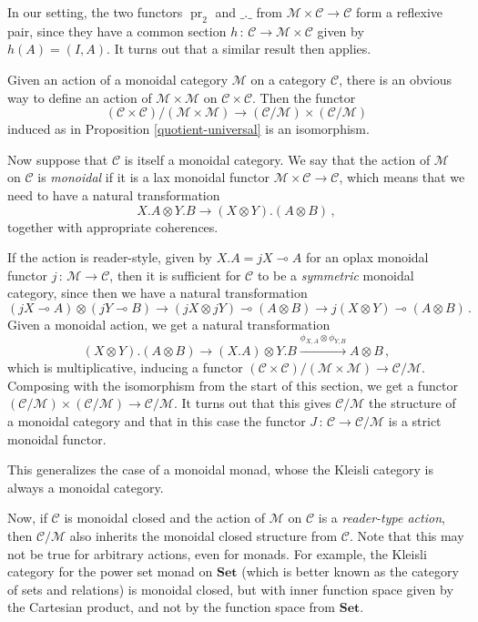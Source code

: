 \documentclass{svproc}
\newcommand\C{\mathcal{C}}
\newcommand\M{\mathcal{M}}
\DeclareMathOperator\pr{pr}
\newcommand\from{\,\colon\,}
\newcommand\tensor\otimes
\renewcommand\implies\multimap
\newcommand{\catname}[1]{\mathbf{#1}}
\newcommand{\Set}{\catname{Set}}
\begin{document}
In our setting, the two functors $\pr_2$ and $\_.\_$ from $\M\times\C \to \C$ form a reflexive pair, since they have a common section $h\from \C \to \M\times \C$ given by $h(A) = (I, A)$.  
It turns out that a similar result then applies.

\begin{proposition}
  Given an action of a monoidal category $\M$ on a category $\C$, there is an obvious way to define an action of $\M\times\M$ on $\C\times\C$.  
  Then the functor
  \[
    (\C\times\C)/(\M\times\M) \to (\C/\M) \times (\C/\M)
    \]
  induced as in Proposition \ref{quotient-universal} is an isomorphism.
  \label{monoidality}
\end{proposition}

Now suppose that $\C$ is itself a monoidal category.  
We say that the action of $\M$ on $\C$ is \emph{monoidal} if it is a lax monoidal functor $\M\times\C\to\C$, which means that we need to have a natural transformation 
\[
  X.A\tensor Y.B\to (X\tensor Y).(A\tensor B)\,,
  \]
together with appropriate coherences.  

If the action is reader-style, given by $X.A = jX \implies A$ for an oplax monoidal functor $j\from \M\to \C$, then it is sufficient for $\C$ to be a \emph{symmetric} monoidal category, since then we have a natural transformation
\[
  (j X \implies A) \tensor (j Y \implies B)
  \rightarrow
  (j X \tensor j Y) \implies (A \tensor B)
  \rightarrow
  j (X\tensor Y) \implies (A \tensor B)\,.
  \]
Given a monoidal action, we get a natural transformation
\[
  (X\tensor Y).(A\tensor B)
  \rightarrow
  (X.A)\tensor Y.B
  \xrightarrow{\phi_{X,A}\tensor \phi_{Y,B}}
  A\tensor B\,,
  \]
which is multiplicative, inducing a functor $(\C\times\C)/(\M\times\M)\to \C/\M$.  
Composing with the isomorphism from the start of this section, we get a functor $(\C/\M)\times(\C/\M)\to\C/\M$.  
It turns out that this gives $\C/\M$ the structure of a monoidal category and that in this case the functor $J\from \C\to\C/\M$ is a strict monoidal functor.

This generalizes the case of a monoidal monad, whose the Kleisli category is always a monoidal category.

Now, if $\C$ is monoidal closed and the action of $\M$ on $\C$ is a \emph{reader-type action}, then $\C/\M$ also inherits the monoidal closed structure from $\C$.  
Note that this may not be true for arbitrary actions, even for monads.  
For example, the Kleisli category for the power set monad on $\Set$ (which is better known as the category of sets and relations) is monoidal closed, but with inner function space given by the Cartesian product, and not by the function space from $\Set$.



\end{document}
